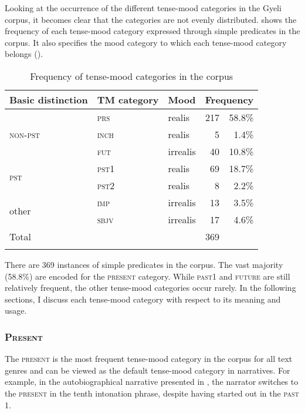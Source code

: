 Looking at the occurrence of the different tense-mood categories in the Gyeli corpus, it becomes clear that the categories are not evenly distributed.   shows the frequency of each tense-mood category expressed through simple predicates in the corpus. It also specifies the mood category to which each tense-mood category belongs (). 

\begin{table}
\begin{tabular}{lllrr}
 \lsptoprule
Basic distinction & TM category & Mood & \multicolumn{2}{c}{Frequency}\\\midrule
 & \textsc{prs} & realis &  217 & 58.8\% \\
\textsc{non-pst} & \textsc{inch} & realis & 5 & 1.4\% \\
 & \textsc{fut} & irrealis &  40 & 10.8\% \\ \midrule
\multirow{2}{*}{\textsc{pst}} &  \textsc{pst1} & realis &  69 & 18.7\% \\
 & \textsc{pst2} & realis & 8 & 2.2\% \\ \midrule
\multirow{2}{*}{other} & \textsc{imp} & irrealis &  13 & 3.5\% \\
 & \textsc{sbjv} & irrealis  & 17 & 4.6\% \\ \midrule
Total & & & 369 & \\
 \lspbottomrule
\end{tabular}
\caption{Frequency of tense-mood categories in the corpus}
\label{Tab:TMFreq}
\end{table}

\noindent  There are 369 instances of simple predicates in the corpus. The vast majority (58.8\%) are encoded for the \textsc{present} category. While \textsc{past1} and \textsc{future} are still relatively frequent, the other tense-mood categories occur rarely. In the following sections, I discuss each tense-mood category with respect to its meaning and usage.








\subsubsection{\textsc{Present}}
\label{sec:pres}

The \textsc{present} is the most frequent tense-mood category in the corpus for all text genres and can be viewed as the default tense-mood category in narratives. For example, in the autobiographical narrative presented in , the narrator switches to the \textsc{present} in the tenth intonation phrase, despite having started out in the \textsc{past 1}.

